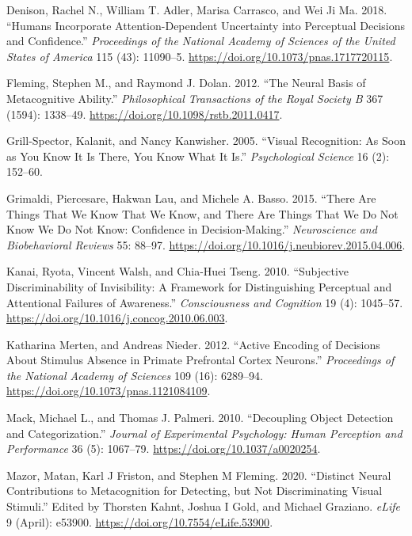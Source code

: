 \documentclass[
]{article}
\begin{document}
\leavevmode\hypertarget{ref-denison2018pnasusa}{}%
Denison, Rachel N., William T. Adler, Marisa Carrasco, and Wei Ji Ma.
2018. ``Humans Incorporate Attention-Dependent Uncertainty into
Perceptual Decisions and Confidence.'' \emph{Proceedings of the National
Academy of Sciences of the United States of America} 115 (43): 11090--5.
\url{https://doi.org/10.1073/pnas.1717720115}.

\leavevmode\hypertarget{ref-fleming2012ptrsb}{}%
Fleming, Stephen M., and Raymond J. Dolan. 2012. ``The Neural Basis of
Metacognitive Ability.'' \emph{Philosophical Transactions of the Royal
Society B} 367 (1594): 1338--49.
\url{https://doi.org/10.1098/rstb.2011.0417}.

\leavevmode\hypertarget{ref-grill-spector2005ps}{}%
Grill-Spector, Kalanit, and Nancy Kanwisher. 2005. ``Visual Recognition:
As Soon as You Know It Is There, You Know What It Is.''
\emph{Psychological Science} 16 (2): 152--60.

\leavevmode\hypertarget{ref-grimaldi2015nbr}{}%
Grimaldi, Piercesare, Hakwan Lau, and Michele A. Basso. 2015. ``There
Are Things That We Know That We Know, and There Are Things That We Do
Not Know We Do Not Know: Confidence in Decision-Making.''
\emph{Neuroscience and Biobehavioral Reviews} 55: 88--97.
\url{https://doi.org/10.1016/j.neubiorev.2015.04.006}.

\leavevmode\hypertarget{ref-kanai2010cc}{}%
Kanai, Ryota, Vincent Walsh, and Chia-Huei Tseng. 2010. ``Subjective
Discriminability of Invisibility: A Framework for Distinguishing
Perceptual and Attentional Failures of Awareness.'' \emph{Consciousness
and Cognition} 19 (4): 1045--57.
\url{https://doi.org/10.1016/j.concog.2010.06.003}.

\leavevmode\hypertarget{ref-katharinamerten2012pnas}{}%
Katharina Merten, and Andreas Nieder. 2012. ``Active Encoding of
Decisions About Stimulus Absence in Primate Prefrontal Cortex Neurons.''
\emph{Proceedings of the National Academy of Sciences} 109 (16):
6289--94. \url{https://doi.org/10.1073/pnas.1121084109}.

\leavevmode\hypertarget{ref-mack2010jephpp}{}%
Mack, Michael L., and Thomas J. Palmeri. 2010. ``Decoupling Object
Detection and Categorization.'' \emph{Journal of Experimental
Psychology: Human Perception and Performance} 36 (5): 1067--79.
\url{https://doi.org/10.1037/a0020254}.

\leavevmode\hypertarget{ref-mazor2020e}{}%
Mazor, Matan, Karl J Friston, and Stephen M Fleming. 2020. ``Distinct
Neural Contributions to Metacognition for Detecting, but Not
Discriminating Visual Stimuli.'' Edited by Thorsten Kahnt, Joshua I
Gold, and Michael Graziano. \emph{eLife} 9 (April): e53900.
\url{https://doi.org/10.7554/eLife.53900}.
\end{document}
